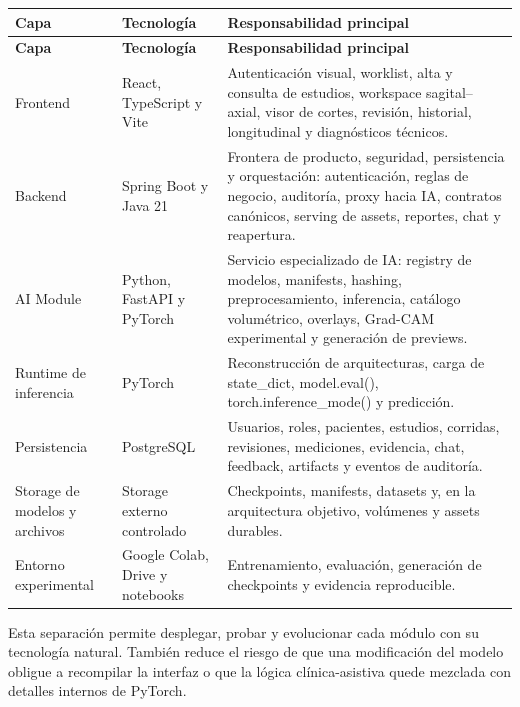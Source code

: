 {\footnotesize
\setlength{\LTleft}{0pt}
\setlength{\LTright}{0pt}
\setlength{\tabcolsep}{2pt}
\renewcommand{\arraystretch}{1.18}
\label{tab:arch-logica-capas}
\begin{longtable}{>{\raggedright\arraybackslash}p{} >{\raggedright\arraybackslash}p{} >{\raggedright\arraybackslash}p{}}
\hline
\textbf{Capa} & \textbf{Tecnología} & \textbf{Responsabilidad principal} \\
\hline
\endfirsthead
\hline
\textbf{Capa} & \textbf{Tecnología} & \textbf{Responsabilidad principal} \\
\hline
\endhead
\hline
\endfoot
Frontend & React, TypeScript y Vite & Autenticación visual, worklist, alta y consulta de estudios, workspace sagital--axial, visor de cortes, revisión, historial, longitudinal y diagnósticos técnicos. \\
Backend & Spring Boot y Java 21 & Frontera de producto, seguridad, persistencia y orquestación: autenticación, reglas de negocio, auditoría, proxy hacia IA, contratos canónicos, serving de assets, reportes, chat y reapertura. \\
AI Module & Python, FastAPI y PyTorch & Servicio especializado de IA: registry de modelos, manifests, hashing, preprocesamiento, inferencia, catálogo volumétrico, overlays, Grad-CAM experimental y generación de previews. \\
Runtime de inferencia & PyTorch & Reconstrucción de arquitecturas, carga de state\_dict, model.eval(), torch.inference\_mode() y predicción. \\
Persistencia & PostgreSQL & Usuarios, roles, pacientes, estudios, corridas, revisiones, mediciones, evidencia, chat, feedback, artifacts y eventos de auditoría. \\
Storage de modelos y archivos & Storage externo controlado & Checkpoints, manifests, datasets y, en la arquitectura objetivo, volúmenes y assets durables. \\
Entorno experimental & Google Colab, Drive y notebooks & Entrenamiento, evaluación, generación de checkpoints y evidencia reproducible. \\
\hline
\end{longtable}
}

Esta separación permite desplegar, probar y evolucionar cada módulo con su tecnología natural. También reduce el riesgo de que una modificación del modelo obligue a recompilar la interfaz o que la lógica clínica-asistiva quede mezclada con detalles internos de PyTorch.

